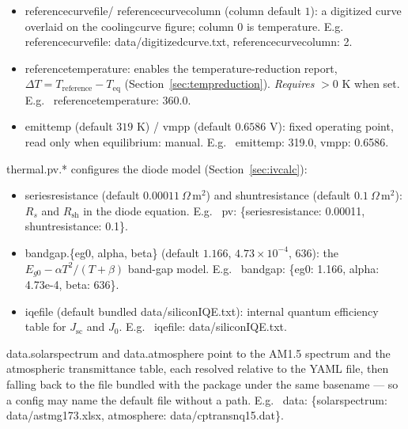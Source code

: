 \documentclass[11pt,a4paper,twoside]{article}
\DeclareRobustCommand{\code}[1]{\begingroup\upshape\ttfamily
  \def\_{\allowbreak\textunderscore\allowbreak}#1\endgroup}
\begin{document}
\begin{itemize}
        \code{absorbed\_solar\_power: 808.0}.
  \item \code{reference\_curve\_file}/\code{reference\_curve\_column}
        (column default \(1\)): a digitized curve overlaid on the
        \code{cooling\_curve} figure; column \(0\) is temperature. E.g.\
        \code{reference\_curve\_file: data/digitized\_curve.txt,
        reference\_curve\_column: 2}.
  \item \code{reference\_temperature}: enables the temperature-reduction
        report, \(\Delta T=T_{\mathrm{reference}}-T_{\mathrm{eq}}\)
        (Section~\ref{sec:tempreduction}). \textit{Requires} \(>0\) K when
        set. E.g.\ \code{reference\_temperature: 360.0}.
  \item \code{emit\_temp} (default \(319\) K) / \code{vmpp} (default
        \(0.6586\) V): fixed operating point, read only when
        \code{equilibrium: manual}. E.g.\
        \code{emit\_temp: 319.0, vmpp: 0.6586}.
\end{itemize}

\code{thermal.pv.*} configures the diode model (Section~\ref{sec:ivcalc}):

\begin{itemize}
  \item \code{series\_resistance} (default \(0.00011\ \Omega\,\mathrm{m^2}\))
        and \code{shunt\_resistance} (default \(0.1\ \Omega\,\mathrm{m^2}\)):
        \(R_s\) and \(R_{\mathrm{sh}}\) in the diode equation. E.g.\
        \code{pv: \{series\_resistance: 0.00011, shunt\_resistance: 0.1\}}.
  \item \code{bandgap.\{eg0, alpha, beta\}} (default \(1.166\),
        \(4.73\times10^{-4}\), \(636\)): the \(E_{g0}-\alpha T^2/(T+\beta)\)
        band-gap model. E.g.\
        \code{bandgap: \{eg0: 1.166, alpha: 4.73e-4, beta: 636\}}.
  \item \code{iqe\_file} (default bundled \code{data/siliconIQE.txt}):
        internal quantum efficiency table for \(J_{\mathrm{sc}}\) and
        \(J_0\). E.g.\ \code{iqe\_file: data/siliconIQE.txt}.
\end{itemize}

\code{data.solar\_spectrum} and \code{data.atmosphere} point to the AM1.5
spectrum and the atmospheric transmittance table, each resolved relative to
the YAML file, then falling back to the file bundled with the package under
the same basename --- so a config may name the default file without a path.
E.g.\ \code{data: \{solar\_spectrum: data/astmg173.xlsx, atmosphere:
data/cptrans\_nq\_100\_15.dat\}}.
\end{document}

